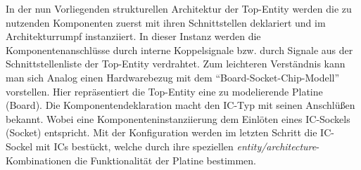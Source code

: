\documentclass{article}
\begin{document}
\vspace{10mm}
In der nun Vorliegenden strukturellen Architektur der Top-Entity werden die zu nutzenden Komponenten
zuerst mit ihren Schnittstellen deklariert und im Architekturrumpf instanziiert. In dieser Instanz
werden die Komponentenanschlüsse durch interne Koppelsignale bzw. durch Signale aus der
Schnittstellenliste der Top-Entity verdrahtet.
Zum leichteren Verständnis kann man sich Analog einen Hardwarebezug mit dem 
"`Board-Socket-Chip-Modell"'\cite{Perry} vorstellen. Hier repräsentiert die Top-Entity eine zu 
modelierende Platine (Board). Die Komponentendeklaration macht den IC-Typ mit seinen Anschlüßen 
bekannt. Wobei eine Komponenteninstanziierung dem Einlöten eines IC-Sockels (Socket) entspricht.
Mit der Konfiguration werden im letzten Schritt die IC-Sockel mit ICs bestückt, welche durch ihre 
speziellen \emph{entity/architecture}-Kombinationen die Funktionalität der Platine bestimmen.
\cite{Reichardt}


\newpage

\listoffigures
\printindex
\end{document}
